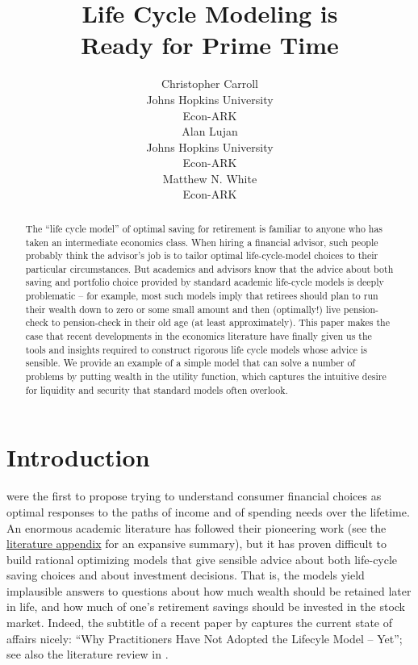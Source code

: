 \documentclass{article}
\title{Life Cycle Modeling is \\ Ready for Prime Time}
\date{\displaydate{articleDate}}
\author{Christopher Carroll\footnotemark[1]\\
Johns Hopkins University\\Econ-ARK\\\AND
Alan Lujan\\
Johns Hopkins University\\Econ-ARK\\\AND
Matthew N. White\\
Econ-ARK\\}
\begin{document}
\maketitle
{}

\begin{abstract}
The ``life cycle model'' of optimal saving for retirement is familiar to anyone who has taken an intermediate economics class.
When hiring a financial advisor, such people probably think the advisor's job is to tailor optimal life-cycle-model choices to their particular circumstances.
But academics and advisors know that the advice about both saving and portfolio choice provided by standard academic life-cycle models is deeply problematic -- for example, most such models imply that retirees should plan to run their wealth down to zero or some small amount and then (optimally!) live pension-check to pension-check in their old age (at least approximately).
This paper makes the case that recent developments in the economics literature have finally given us the tools and insights required to construct rigorous life cycle models whose advice is sensible.
We provide an example of a simple model that can solve a number of problems by putting wealth in the utility function, which captures the intuitive desire for liquidity and security that standard models often overlook.
\end{abstract}

\keywords{}

\section{Introduction}

\cite{modigliani1954} were the first to propose trying to understand consumer financial choices as optimal responses to the paths of income and of spending needs over the lifetime.
An enormous academic literature has followed their pioneering work (see the \href{/lit-review}{literature appendix} for an expansive summary),
but it has proven difficult to build rational optimizing models that give sensible advice about both life-cycle saving choices and about investment decisions.
That is, the models yield implausible answers to questions about how much wealth should be retained later in life, and how much of one's retirement savings should be invested in the stock market.
Indeed, the subtitle of a recent paper by \cite{Daga_2023} captures the current state of affairs nicely: ``Why Practitioners Have Not Adopted the Lifecyle Model -- Yet''; see also the literature review in \cite{DeNardi2016d}.
\end{document}
